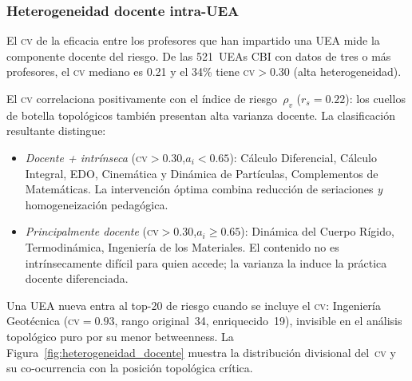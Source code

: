 \documentclass[11pt,letterpaper]{article}
\begin{document}
\subsubsection{Heterogeneidad docente intra-UEA}

El \textsc{cv} de la eficacia entre los profesores que han impartido una
UEA mide la componente docente del riesgo.
De las 521~UEAs CBI con datos de tres o más profesores,
el \textsc{cv} mediano es 0.21 y el 34\% tiene \textsc{cv}$>0.30$
(alta heterogeneidad).

El \textsc{cv} correlaciona positivamente con el índice de riesgo~$\rho_v$
($r_s = 0.22$): los cuellos de botella topológicos también presentan
alta varianza docente.
La clasificación resultante distingue:
\begin{itemize}[leftmargin=2em]
  \item \emph{Docente + intrínseca} (\textsc{cv}$>0.30$,\;$a_i<0.65$):
        Cálculo Diferencial, Cálculo Integral, EDO, Cinemática y
        Dinámica de Partículas, Complementos de Matemáticas.
        La intervención óptima combina reducción de seriaciones
        \emph{y} homogeneización pedagógica.
  \item \emph{Principalmente docente} (\textsc{cv}$>0.30$,\;$a_i\geq0.65$):
        Dinámica del Cuerpo Rígido, Termodinámica, Ingeniería de los Materiales.
        El contenido no es intrínsecamente difícil para quien accede; la
        varianza la induce la práctica docente diferenciada.
\end{itemize}
Una UEA nueva entra al top-20 de riesgo cuando se incluye el \textsc{cv}:
Ingeniería Geotécnica (\textsc{cv}$=0.93$, rango original~34, enriquecido~19),
invisible en el análisis topológico puro por su menor betweenness.
La Figura~\ref{fig:heterogeneidad_docente} muestra la distribución divisional
del~\textsc{cv} y su co-ocurrencia con la posición topológica crítica.
\end{document}
